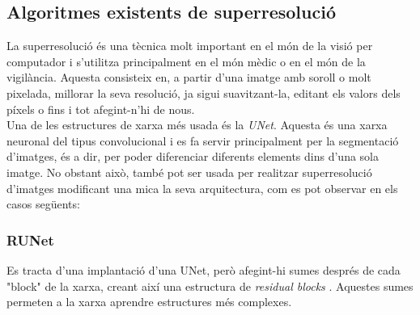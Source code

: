 ﻿\documentclass[10pt,a4paper,twocolumn,twoside]{article}
\begin{document}
\subsection{Algoritmes existents de superresolució}
La superresolució és una tècnica molt important en el món de la visió per computador i s'utilitza principalment en el món mèdic o en el món de la vigilància. Aquesta consisteix en, a partir d'una imatge amb soroll o molt pixelada, millorar la seva resolució, ja sigui suavitzant-la, editant els valors dels píxels o fins i tot afegint-n'hi de nous.\\

Una de les estructures de xarxa més usada és la \textit{UNet}. Aquesta és una xarxa neuronal del tipus convolucional i es fa servir principalment per la segmentació d'imatges, és a dir, per poder diferenciar diferents elements dins d'una sola imatge.
No obstant això, també pot ser usada per realitzar superresolució d'imatges modificant una mica la seva arquitectura, com es pot observar en els casos següents:

\subsubsection{RUNet}
Es tracta d'una implantació d'una UNet, però afegint-hi sumes després de cada "block" de la xarxa, creant així una estructura de \textit{residual blocks} \cite{RUNet}. Aquestes sumes permeten a la xarxa aprendre estructures més complexes.

\end{document}
